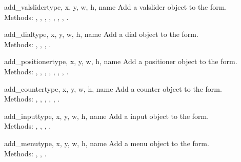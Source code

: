 \begin{flushleft}
\begin{methoddesc}[form]{add_valslider}{type, x, y, w, h, name}
Add a valslider object to the form. \\
Methods:
,
,
,
,
,
,
,
.
\end{methoddesc}

\begin{methoddesc}[form]{add_dial}{type, x, y, w, h, name}
Add a dial object to the form. \\
Methods:
,
,
,
.
\end{methoddesc}

\begin{methoddesc}[form]{add_positioner}{type, x, y, w, h, name}
Add a positioner object to the form. \\
Methods:
,
,
,
,
,
,
,
.
\end{methoddesc}

\begin{methoddesc}[form]{add_counter}{type, x, y, w, h, name}
Add a counter object to the form. \\
Methods:
,
,
,
,
,
.
\end{methoddesc}


\begin{methoddesc}[form]{add_input}{type, x, y, w, h, name}
Add a input object to the form. \\
Methods:
,
,
,
.
\end{methoddesc}


\begin{methoddesc}[form]{add_menu}{type, x, y, w, h, name}
Add a menu object to the form. \\
Methods:
,
,
.
\end{methoddesc}


\end{flushleft}
